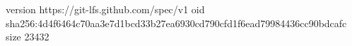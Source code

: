 version https://git-lfs.github.com/spec/v1
oid sha256:4d4f6464c70aa3e7d1bcd33b27ea6930cd790cfd1f6ead79984436cc90bdcafc
size 23432

